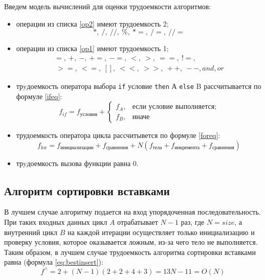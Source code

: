 Введем модель вычислений для оценки трудоемкости алгоритмов:
\begin{itemize}[left=\parindent]
    \item операции из списка \ref{op2} имеют трудоемкость 2;
        \begin{equation}\label{op2}
            *,~/,~//,~\%,~*=,~/=,~//=
        \end{equation}

    \item операции из списка \ref{op1} имеют трудоемкость 1;
        \begin{equation}\label{op1}
            \begin{aligned}
                =,~+,~-,~+=,~-=,~<,~>,~==,~!=,\\
                ~>=, ~<=,~[],~<<,~>>,~++,~--,and,or
            \end{aligned}
        \end{equation}

    \item трyдоемкость оператора выбора \texttt{if} условие \texttt{then} А
        \texttt{else} B рассчитывается по формуле \ref{ifeq}:
        \begin{equation}\label{ifeq}
            f_{if} = f_{условия} +
            \begin{cases}
                f_A, & \text{если условие выполняется;}\\
                f_B, & \text{иначе}
            \end{cases}
        \end{equation}

    \item трудоемкость оператора цикла рассчитывется по формуле \ref{foreq}:
        \begin{equation}\label{foreq}
            f_{\text{for}} = f_{\text{инициализации}} + f_{\text{сравнения}} +
                      N(f_{\text{тела}} + f_{\text{инкремента}} +
                      f_{\text{сравнения}})
        \end{equation}

    \item трyдоемкость вызова функции равна 0.
\end{itemize}

\subsection{Алгоритм сортировки вставками}

В лучшем случае алгоритму подается на вход упорядоченная последовательность.
При таких входных данных цикл $A$ отрабатывает $N - 1$ раз, где $N = size$, а
внутренний цикл $B$ на каждой итерации осуществляет только инициализацию и
проверку условия, которое оказывается ложным, из-за чего тело не выполняется. 
Таким образом, в лучшем случае трудоемкость алгоритма сортировки вставками
равна (формула \ref{eq:bestinsert}):
    \begin{equation}\label{eq:bestinsert}
        f^{\wedge} = 2 + (N - 1)(2 + 2 + 4 + 3) = 13N - 11=O(N)    
    \end{equation}

